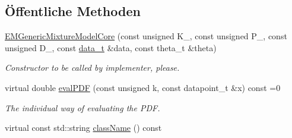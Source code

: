 \subsection*{Öffentliche Methoden}
\begin{DoxyCompactItemize}
\item 
\hyperlink{classCDA_1_1EMGenericMixtureModelCore_a859924898febe8bae4a8ce2c4aebdeab}{EMGenericMixtureModelCore} (const unsigned K\_\-, const unsigned P\_\-, const unsigned D\_\-, const \hyperlink{classCDA_1_1VectorEMData}{data\_\-t} \&data, const theta\_\-t \&theta)
\begin{DoxyCompactList}\small\item\em Constructor to be called by implementer, please. \item\end{DoxyCompactList}\item 
virtual double \hyperlink{classCDA_1_1EMGenericMixtureModelCore_ad8722983ea6f58d6e0b4a6bd117b050a}{evalPDF} (const unsigned k, const datapoint\_\-t \&x) const =0
\begin{DoxyCompactList}\small\item\em The individual way of evaluating the PDF. \item\end{DoxyCompactList}\item 
\hypertarget{classCDA_1_1EMGenericMixtureModelCore_a6e444765b04615888d41c4ab6c82ae61}{
virtual const std::string \hyperlink{classCDA_1_1EMGenericMixtureModelCore_a6e444765b04615888d41c4ab6c82ae61}{className} () const }
\label{classCDA_1_1EMGenericMixtureModelCore_a6e444765b04615888d41c4ab6c82ae61}


\end{DoxyCompactItemize}

